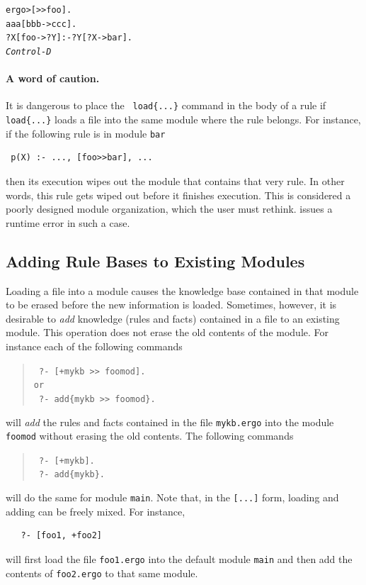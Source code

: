 \documentclass[11pt]{article}
\newcommand{\ERGO}{\mbox{\smaller{\ensuremath{\cal{E}}\smaller{{\sc{RGO}}}}}\xspace}
\newcommand{\FLSYSTEM}{\ERGO}
\newcommand{\prompt}{ergo> }
\newcommand{\ergoext}{ergo\xspace}
\begin{document}
\begin{alltt}
 \prompt [>{}>foo].
 aaa[bbb->ccc].
 ?X[foo->?Y] :- ?Y[?X->bar].
 \emph{Control-D}  
\end{alltt}


\paragraph{A word of caution.} It is dangerous to place the {\tt
  load\{...\}} command
in the body of a rule if {\tt load\{...\}} loads a file into the same module
where the rule belongs. For instance, if the following rule is in module
{\tt bar}  
\begin{verbatim}
 p(X) :- ..., [foo>>bar], ...  
\end{verbatim}
then its execution wipes out the module that contains that very
rule. In other words,
this rule gets wiped out before it finishes execution.
This is considered a poorly designed module organization, which the
user must rethink.
\FLSYSTEM issues a runtime error in such a case.


\subsection{Adding Rule Bases to Existing Modules}\label{sec-adding-to-mod}

Loading a file into a module causes the knowledge base contained in that
module to be erased before the new information is loaded. Sometimes,
however, it is desirable to \emph{add} knowledge (rules and facts)
contained in a file to an existing module.
This operation does not erase the old contents of the module.
For instance each of the following commands 

\index{[+file]}
\begin{quote}
  \tt
   ?- [+mykb >{}> foomod].\\
   or
   \\
    \tt
   ?- add\{mykb >{}> foomod\}.
\end{quote}
will \emph{add} the rules and facts contained in the file {\tt mykb.\ergoext} into the
module {\tt foomod} without erasing the old contents. The following commands
\begin{quote}
  \tt
   ?- [+mykb].\\
    \tt
   ?- add\{mykb\}.
\end{quote}
will do the same for module {\tt main}. Note that, in the {\tt [...]} form,  
loading and adding can be freely mixed. For instance, 
\begin{verbatim}
   ?- [foo1, +foo2]  
\end{verbatim}
will first load the file {\tt foo1.\ergoext} into the default module {\tt main}
and then add the contents of {\tt foo2.\ergoext} to that same module.
\end{document}
